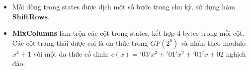 \begin{enumerate}[label= \textbf{Bước \arabic*:}]
\begin{itemize}
\begin{itemize}
			\begin{align*}
				\begin{bmatrix} 
					y_0\\y_1\\ y_2\\y_3\\y_4\\y_5\\y_6\\y_7
				\end{bmatrix} &= 
				\begin{bmatrix}
					1 & 0 & 0 & 0 & 1 & 1 & 1 & 1\\
					1 & 1 & 0 & 0 & 0 & 1 & 1 & 1\\
					1 & 1 & 1 & 0 & 0 & 0 & 1 & 1\\
					1 & 1 & 1 & 1 & 0 & 0 & 0 & 1\\
					1 & 1 & 1 & 1 & 1 & 0 & 0 & 0\\
					0 & 1 & 1 & 1 & 1 & 1 & 0 & 0\\
					0 & 0 & 1 & 1 & 1 & 1 & 1 & 0\\
					0 & 0 & 0 & 1 & 1 & 1 & 1 & 1\\
				\end{bmatrix}
				\begin{bmatrix} 
					x_0\\x_1\\x_2\\x_3\\x_4\\x_5\\x_6\\x_7
				\end{bmatrix}
				+
				\begin{bmatrix}
					1\\1\\0\\0\\0\\1\\1\\0
				\end{bmatrix}
			\end{align*}
			
		\end{itemize}
		\item Mỗi dòng trong states được dịch một số bước trong chu kỳ, sử dụng hàm \textbf{ShiftRows}.
		\item \textbf{MixColumns} làm trộn các cột trong states, kết hợp 4 bytes trong mỗi cột. 
		Các cột trạng thái được coi là đa thức trong $GF(2^8)$ và nhân theo modulo $x^4+1$ với một đa thức cố định: $c(x)='03'x^3+'01'x^2+'01'x+02$ nghịch đảo.
		

\end{itemize}
\end{enumerate}
